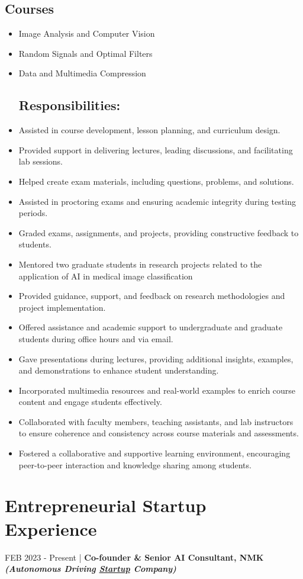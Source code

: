\documentclass[letterpaper,
		10pt]{article}
\begin{document}
\subsection{Courses}
\begin{itemize}
\item Image Analysis and Computer Vision
\item Random Signals and Optimal Filters
\item Data and Multimedia Compression
\subsection{Responsibilities:}
\item Assisted in course development, lesson planning, and curriculum design.
\item Provided support in delivering lectures, leading discussions, and facilitating lab sessions.
\item Helped create exam materials, including questions, problems, and solutions.
\item Assisted in proctoring exams and ensuring academic integrity during testing periods.
\item Graded exams, assignments, and projects, providing constructive feedback to students.
\item Mentored two graduate students in research projects related to the application of AI in medical image classification
\item Provided guidance, support, and feedback on research methodologies and project implementation.
\item Offered assistance and academic support to undergraduate and graduate students during office hours and via email.
\item Gave presentations during lectures, providing additional insights, examples, and demonstrations to enhance student understanding.
\item Incorporated multimedia resources and real-world examples to enrich course content and engage students effectively.
\item Collaborated with faculty members, teaching assistants, and lab instructors to ensure coherence and consistency across course materials and assessments.
\item Fostered a collaborative and supportive learning environment, encouraging peer-to-peer interaction and knowledge sharing among students.
\end{itemize}


\section{Entrepreneurial Startup Experience}
FEB 2023 - Present | \textbf{Co-founder \& Senior AI Consultant, NMK} \textit{\textbf{ (Autonomous Driving \underline{Startup} Company)}}
\end{document}
